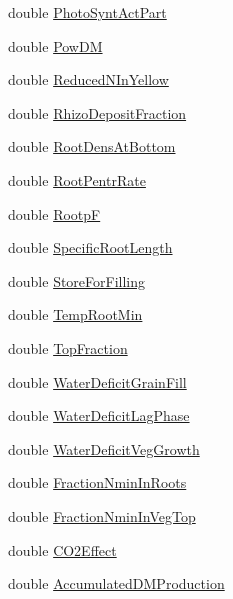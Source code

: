 \begin{DoxyCompactItemize}
\item 
double \hyperlink{classcrop_parameters_crop_a76c4677d996e942c942a88b9bb2237fc}{PhotoSyntActPart}
\item 
double \hyperlink{classcrop_parameters_crop_aed593b2bdf5ab36c8d35811ab5800870}{PowDM}
\item 
double \hyperlink{classcrop_parameters_crop_ab99fa405ffc27efd6f9b0f9c27114e2d}{ReducedNInYellow}
\item 
double \hyperlink{classcrop_parameters_crop_a6b769cc9ee7426847569c435fc5bd0a0}{RhizoDepositFraction}
\item 
double \hyperlink{classcrop_parameters_crop_a7af995c41741eec98bda5611030b839d}{RootDensAtBottom}
\item 
double \hyperlink{classcrop_parameters_crop_a2f6d854a3428c48efd56f637106a9656}{RootPentrRate}
\item 
double \hyperlink{classcrop_parameters_crop_a990bb2e5d206837c6754ab3533902052}{RootpF}
\item 
double \hyperlink{classcrop_parameters_crop_a6c0f861aa72bcf37c691f725c3ed91d2}{SpecificRootLength}
\item 
double \hyperlink{classcrop_parameters_crop_a5b0abf829c1088fee32825305ce06a58}{StoreForFilling}
\item 
double \hyperlink{classcrop_parameters_crop_aafed8bc854ea617acd40d80389ad3134}{TempRootMin}
\item 
double \hyperlink{classcrop_parameters_crop_a72b49335ad8e2ccde81d030fda246079}{TopFraction}
\item 
double \hyperlink{classcrop_parameters_crop_ad184945b5fc6c41b7d5be32d2de03c25}{WaterDeficitGrainFill}
\item 
double \hyperlink{classcrop_parameters_crop_a6f4ce80b850481e92d65d830b9bbd369}{WaterDeficitLagPhase}
\item 
double \hyperlink{classcrop_parameters_crop_aa419ad5f8a4da685c4972b8fa36a19b2}{WaterDeficitVegGrowth}
\item 
double \hyperlink{classcrop_parameters_crop_a48faf0f3b63ad860bfd3acd850170a3a}{FractionNminInRoots}
\item 
double \hyperlink{classcrop_parameters_crop_a14ae905fa7cf77559fb195197688ad46}{FractionNminInVegTop}
\item 
double \hyperlink{classcrop_parameters_crop_a4c067993ca90ecabaf656ce657da4dce}{CO2Effect}
\item 
double \hyperlink{classcrop_parameters_crop_ab5a253ffc5e3984ca44af09614fa4fd3}{AccumulatedDMProduction}
\item 

\end{DoxyCompactItemize}
